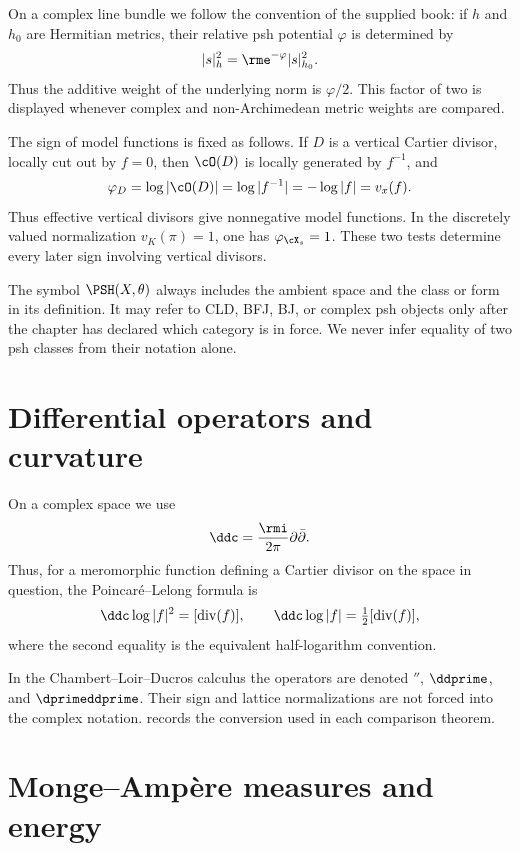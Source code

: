 On a complex line bundle we follow the convention of the supplied book: if
\(h\) and \(h_0\) are Hermitian metrics, their relative psh potential
\(\varphi\) is determined by
\[
  |s|_h^2=\rme^{-\varphi}|s|_{h_0}^2 .
\]
Thus the additive weight of the underlying norm is \(\varphi/2\).  This
factor of two is displayed whenever complex and non-Archimedean metric
weights are compared.

The sign of model functions is fixed as follows.  If \(D\) is a vertical
Cartier divisor, locally cut out by \(f=0\), then \(\cO(D)\) is locally
generated by \(f^{-1}\), and
\[
  \varphi_D=\log|\cO(D)|=\log|f^{-1}|=-\log|f|=v_x(f).
\]
Thus effective vertical divisors give nonnegative model functions.  In the
discretely valued normalization \(v_K(\pi)=1\), one has
\(\varphi_{\cX_s}=1\).  These two tests determine every later sign involving
vertical divisors.

The symbol \(\PSH(X,\theta)\) always includes the ambient space and the class
or form in its definition.  It may refer to CLD, BFJ, BJ, or complex psh
objects only after the chapter has declared which category is in force.  We
never infer equality of two psh classes from their notation alone.

\section*{Differential operators and curvature}
\label{front:conventions-curvature}

On a complex space we use
\[
  \ddc=\frac{\rmi}{2\pi}\partial\bar\partial.
\]
Thus, for a meromorphic function defining a Cartier divisor on the
space in question, the Poincaré--Lelong formula is
\[
 \ddc\log|f|^2=[\operatorname{div}(f)],
 \qquad
 \ddc\log|f|=\tfrac12[\operatorname{div}(f)],
\]
where the second equality is the equivalent half-logarithm convention.

In the Chambert--Loir--Ducros calculus the operators are denoted
\(\dprime\), \(\ddprime\), and \(\dprimeddprime\).  Their sign and lattice
normalizations are not forced into the complex notation.   records
the conversion used in each comparison theorem.

\section*{Monge--Ampère measures and energy}
\label{front:conventions-mass-energy}

